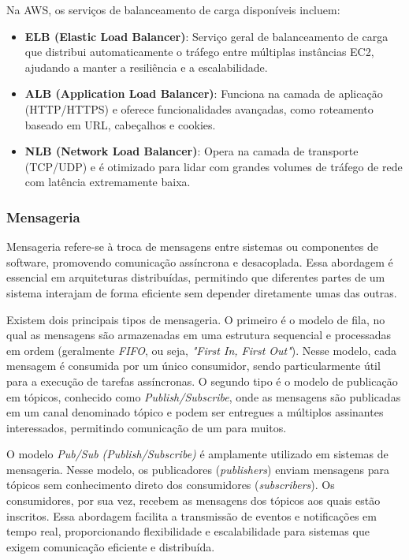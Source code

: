 Na AWS, os serviços de balanceamento de carga disponíveis incluem:

\begin{itemize}
    \item \textbf{ELB (Elastic Load Balancer)}: Serviço geral de balanceamento de carga que distribui automaticamente o tráfego entre múltiplas instâncias EC2, ajudando a manter a resiliência e a escalabilidade.
    \item \textbf{ALB (Application Load Balancer)}: Funciona na camada de aplicação (HTTP/HTTPS) e oferece funcionalidades avançadas, como roteamento baseado em URL, cabeçalhos e cookies.
    \item \textbf{NLB (Network Load Balancer)}: Opera na camada de transporte (TCP/UDP) e é otimizado para lidar com grandes volumes de tráfego de rede com latência extremamente baixa.
\end{itemize}

\subsubsection{Mensageria}


Mensageria refere-se à troca de mensagens entre sistemas ou componentes de software, promovendo comunicação assíncrona e desacoplada. Essa abordagem é essencial em arquiteturas distribuídas, permitindo que diferentes partes de um sistema interajam de forma eficiente sem depender diretamente umas das outras.

Existem dois principais tipos de mensageria\cite{what-is-message-broker}. O primeiro é o modelo de fila, no qual as mensagens são armazenadas em uma estrutura sequencial e processadas em ordem (geralmente \emph{FIFO}, ou seja, \emph{"First In, First Out"}). Nesse modelo, cada mensagem é consumida por um único consumidor, sendo particularmente útil para a execução de tarefas assíncronas. O segundo tipo é o modelo de publicação em tópicos, conhecido como \emph{Publish/Subscribe}, onde as mensagens são publicadas em um canal denominado tópico e podem ser entregues a múltiplos assinantes interessados, permitindo comunicação de um para muitos.

O modelo \emph{Pub/Sub (Publish/Subscribe)} é amplamente utilizado em sistemas de mensageria. Nesse modelo, os publicadores (\emph{publishers}) enviam mensagens para tópicos sem conhecimento direto dos consumidores (\emph{subscribers}). Os consumidores, por sua vez, recebem as mensagens dos tópicos aos quais estão inscritos. Essa abordagem facilita a transmissão de eventos e notificações em tempo real, proporcionando flexibilidade e escalabilidade para sistemas que exigem comunicação eficiente e distribuída.


